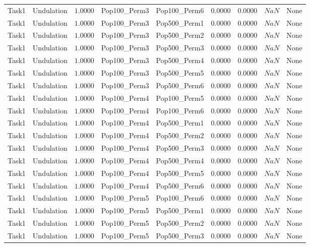 \documentclass[8pt]{article}
\begin{document}
\begin{longtable}{llccccccc}
Task1 & Undulation & $1.0000$ & Pop100\_Perm3 & Pop100\_Perm6 & 0.0000 & 0.0000 & $NaN$ & None \\
Task1 & Undulation & $1.0000$ & Pop100\_Perm3 & Pop500\_Perm1 & 0.0000 & 0.0000 & $NaN$ & None \\
Task1 & Undulation & $1.0000$ & Pop100\_Perm3 & Pop500\_Perm2 & 0.0000 & 0.0000 & $NaN$ & None \\
Task1 & Undulation & $1.0000$ & Pop100\_Perm3 & Pop500\_Perm3 & 0.0000 & 0.0000 & $NaN$ & None \\
Task1 & Undulation & $1.0000$ & Pop100\_Perm3 & Pop500\_Perm4 & 0.0000 & 0.0000 & $NaN$ & None \\
Task1 & Undulation & $1.0000$ & Pop100\_Perm3 & Pop500\_Perm5 & 0.0000 & 0.0000 & $NaN$ & None \\
Task1 & Undulation & $1.0000$ & Pop100\_Perm3 & Pop500\_Perm6 & 0.0000 & 0.0000 & $NaN$ & None \\
Task1 & Undulation & $1.0000$ & Pop100\_Perm4 & Pop100\_Perm5 & 0.0000 & 0.0000 & $NaN$ & None \\
Task1 & Undulation & $1.0000$ & Pop100\_Perm4 & Pop100\_Perm6 & 0.0000 & 0.0000 & $NaN$ & None \\
Task1 & Undulation & $1.0000$ & Pop100\_Perm4 & Pop500\_Perm1 & 0.0000 & 0.0000 & $NaN$ & None \\
Task1 & Undulation & $1.0000$ & Pop100\_Perm4 & Pop500\_Perm2 & 0.0000 & 0.0000 & $NaN$ & None \\
Task1 & Undulation & $1.0000$ & Pop100\_Perm4 & Pop500\_Perm3 & 0.0000 & 0.0000 & $NaN$ & None \\
Task1 & Undulation & $1.0000$ & Pop100\_Perm4 & Pop500\_Perm4 & 0.0000 & 0.0000 & $NaN$ & None \\
Task1 & Undulation & $1.0000$ & Pop100\_Perm4 & Pop500\_Perm5 & 0.0000 & 0.0000 & $NaN$ & None \\
Task1 & Undulation & $1.0000$ & Pop100\_Perm4 & Pop500\_Perm6 & 0.0000 & 0.0000 & $NaN$ & None \\
Task1 & Undulation & $1.0000$ & Pop100\_Perm5 & Pop100\_Perm6 & 0.0000 & 0.0000 & $NaN$ & None \\
Task1 & Undulation & $1.0000$ & Pop100\_Perm5 & Pop500\_Perm1 & 0.0000 & 0.0000 & $NaN$ & None \\
Task1 & Undulation & $1.0000$ & Pop100\_Perm5 & Pop500\_Perm2 & 0.0000 & 0.0000 & $NaN$ & None \\
Task1 & Undulation & $1.0000$ & Pop100\_Perm5 & Pop500\_Perm3 & 0.0000 & 0.0000 & $NaN$ & None \\

\end{longtable}
\end{document}
